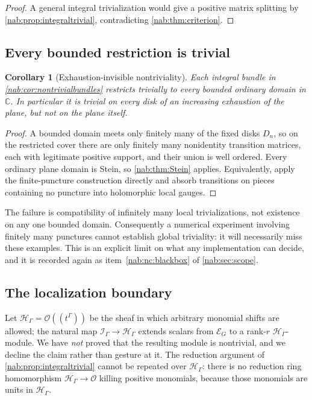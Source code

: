 \documentclass[11pt,letterpaper]{article}
\newtheorem{corollary}[corollary]{Corollary}
\theoremstyle{definition}
\theoremstyle{remark}
\newcommand{\C}{\mathbb C}
\newcommand{\OO}{\mathcal O}
\newcommand{\HH}{\mathscr H_\Gamma}
\newcommand{\II}{\mathscr I_\Gamma}
\numberwithin{equation}{section}
\begin{document}
\begin{proof}
A general integral trivialization would give a positive matrix splitting by
\cref{nab:prop:integraltrivial}, contradicting \cref{nab:thm:criterion}.
\end{proof}

\subsection{Every bounded restriction is trivial}

\begin{corollary}[Exhaustion-invisible nontriviality]\label{nab:cor:bounded}
Each integral bundle in \cref{nab:cor:nontrivialbundles} restricts trivially
to every bounded ordinary domain in $\C$. In particular it is trivial on every
disk of an increasing exhaustion of the plane, but not on the plane itself.
\end{corollary}

\begin{proof}
A bounded domain meets only finitely many of the fixed disks $D_n$, so on the
restricted cover there are only finitely many nonidentity transition matrices,
each with legitimate positive support, and their union is well ordered. Every
ordinary plane domain is Stein, so \cref{nab:thm:Stein} applies. Equivalently,
apply the finite-puncture construction directly and absorb transitions on
pieces containing no puncture into holomorphic local gauges.
\end{proof}

The failure is compatibility of infinitely many local trivializations, not
existence on any one bounded domain. Consequently a numerical experiment
involving finitely many punctures cannot establish global triviality: it will
necessarily miss these examples. This is an explicit limit on what any
implementation can decide, and it is recorded again as
item~\ref{nab:nc:blackbox} of \cref{nab:sec:scope}.

\subsection{The localization boundary}\label{nab:loc:sub:boundary}

Let $\HH=\OO((t^\Gamma))$ be the sheaf in which arbitrary monomial shifts are
allowed; the natural map $\II\to\HH$ extends scalars from $\mathcal E_G$ to a
rank-$r$ $\HH$-module. We have \emph{not} proved that the resulting module is
nontrivial, and we decline the claim rather than gesture at it. The reduction
argument of \cref{nab:prop:integraltrivial} cannot be repeated over $\HH$:
there is no reduction ring homomorphism $\HH\to\OO$ killing positive
monomials, because those monomials are units in $\HH$.
\end{document}
